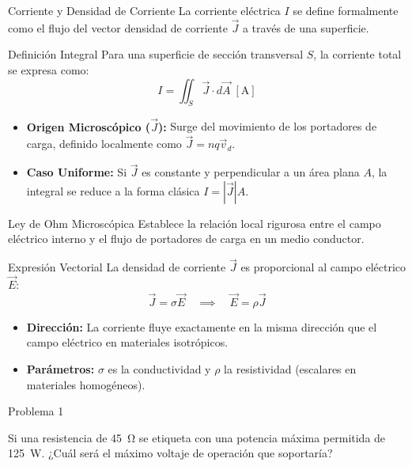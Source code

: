 \documentclass[10pt, aspectratio=169]{beamer}
\begin{document}
\begin{frame}{Corriente y Densidad de Corriente}
    La corriente eléctrica $I$ se define formalmente como el flujo del vector densidad de corriente $\vec{J}$ a través de una superficie.
    \begin{boxTeoria}{Definición Integral}
        Para una superficie de sección transversal $S$, la corriente total se expresa como:
        \begin{equation*}
            I = \iint_S \vec{J} \cdot d\vec{A} \;[\unit{\A}]
        \end{equation*}
    \end{boxTeoria}

    \begin{itemize}
        \item \textbf{Origen Microscópico ($\vec{J}$):} Surge del movimiento de los portadores de carga, definido localmente como $\vec{J} = n q \vec{v}_d$.
        \item \textbf{Caso Uniforme:} Si $\vec{J}$ es constante y perpendicular a un área plana $A$, la integral se reduce a la forma clásica $I = |\vec{J}| A$.
    \end{itemize}
\end{frame}


\begin{frame}{Ley de Ohm Microscópica}
    Establece la relación local rigurosa entre el campo eléctrico interno y el flujo de portadores de carga en un medio conductor.
    \begin{boxTeoria}{Expresión Vectorial}
        La densidad de corriente $\vec{J}$ es proporcional al campo eléctrico $\vec{E}$:
        \begin{equation*}
            \vec{J} = \sigma \vec{E} \quad \implies \quad \vec{E} = \rho \vec{J}
        \end{equation*}
    \end{boxTeoria}

    \begin{itemize}
        \item \textbf{Dirección:} La corriente fluye exactamente en la misma dirección que el campo eléctrico en materiales isotrópicos.
        \item \textbf{Parámetros:} $\sigma$ es la conductividad y $\rho$ la resistividad (escalares en materiales homogéneos).
    \end{itemize}
\end{frame}

\begin{frame}{Problema 1}

    Si una resistencia de \qty{45}{\ohm} se etiqueta con una potencia máxima permitida de \qty{125}{\W}. ¿Cuál será el máximo voltaje de operación que soportaría?

\end{frame}
\end{document}
